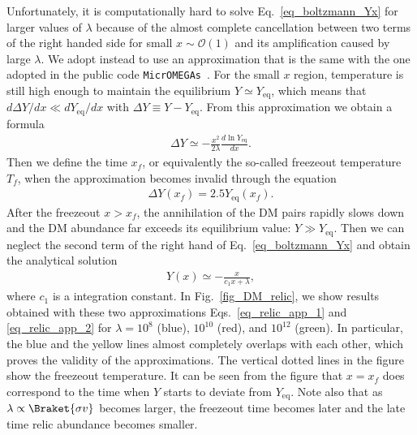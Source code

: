 \documentclass[12pt,twoside,book]{article}
\begin{document}
Unfortunately, it is computationally hard to solve
Eq.~\eqref{eq_boltzmann_Yx} for larger values of $\lambda$ because of
the almost complete cancellation between two terms of the right handed
side for small $x\sim \mathcal{O}(1)$ and its amplification caused by
large $\lambda$.  We adopt instead to use an approximation that is the
same with the one adopted in the public code
\texttt{MicrOMEGAs}~\cite{Belanger:2001fz, Belanger:2018mqt}.  For the
small $x$ region, temperature is still high enough to maintain the
equilibrium $Y \simeq Y_{\mathrm{eq}}$, which means that $d \Delta Y / d
x \ll d Y_{\mathrm{eq}} / d x$ with $\Delta Y \equiv Y -
Y_{\mathrm{eq}}$.  From this approximation we obtain a formula
\begin{align}
 \Delta Y \simeq -\frac{x^2}{2 \lambda} \frac{d \ln Y_{\mathrm{eq}}}{d x}.\label{eq_relic_app_1}
\end{align}
Then we define the time $x_f$, or equivalently the so-called freezeout
temperature $T_f$, when the approximation becomes invalid through the
equation
\begin{align}
 \Delta Y (x_f) = 2.5 Y_{\mathrm{eq}} (x_f).
\end{align}
After the freezeout $x > x_f$, the annihilation of the DM pairs
rapidly slows down and the DM abundance far exceeds its equilibrium
value: $Y \gg Y_{\mathrm{eq}}$.    Then we can neglect the
second term of the right hand of Eq.~\eqref{eq_boltzmann_Yx} and
obtain the analytical solution
\begin{align}
 Y(x) \simeq - \frac{x}{c_1 x + \lambda},\label{eq_relic_app_2}
\end{align}
where $c_1$ is a integration constant.  In Fig.~\ref{fig_DM_relic}, we
show results obtained with these two approximations
Eqs.~\eqref{eq_relic_app_1} and \eqref{eq_relic_app_2} for $\lambda =
10^8$ (blue), $10^{10}$ (red), and $10^{12}$ (green).  In particular,
the blue and the yellow lines almost completely overlaps with each
other, which proves the validity of the approximations.  The vertical
dotted lines in the figure show the freezeout temperature.  It can be
seen from the figure that $x = x_f$ does correspond to the time when $Y$
starts to deviate from $Y_{\mathrm{eq}}$.  Note also that as $\lambda
\propto \Braket{\sigma v}$ becomes larger, the freezeout time becomes
later and the late time relic abundance becomes smaller.
\end{document}
